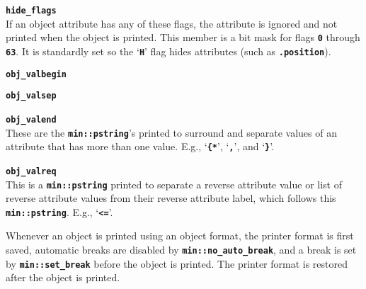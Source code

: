 \documentclass[12pt]{article}
\makeatletter
\newcommand{\TT}[1]{{\tt \bfseries #1}}
\newcommand{\ttmkey}[2]{\TT{#1}\index{#1@{\tt #1}!#2}}
\newcommand{\EOL}{\penalty \exhyphenpenalty}
\newenvironment{itemlist}[1][1.2in]%
	{\begin{list}{}{\setlength{\labelwidth}{#1}%
		        \setlength{\leftmargin}{\labelwidth}%
		        \addtolength{\leftmargin}{+0.2in}%
		        \renewcommand{\makelabel}[1]{##1\hfill}}}%
	{\end{list}}
\makeatother
\begin{document}
\begin{itemlist}[0.2in]
\item[\ttmkey{hide\_flags}{in {\tt min::obj\_format}}]~\\
If an object attribute has any of these flags, the attribute is ignored
and not printed when the object is printed.  This member is a bit
mask for flags \TT{0} through \TT{63}.  It is standardly set so the
`\TT{H}' flag hides attributes (such as \TT{.position}).

\item[\ttmkey{obj\_valbegin}{in {\tt min::obj\_format}}]
\item[\ttmkey{obj\_valsep}{in {\tt min::obj\_format}}]\vspace{-2ex}
\item[\ttmkey{obj\_valend}{in {\tt min::obj\_format}}]\vspace{-2ex}~\\
These are the \TT{min::pstring}'s printed to surround and
separate values of an attribute that has more than one
value.  E.g., `\TT{\{*}', `\TT{,}', and `\TT{*\}}'.

\item[\ttmkey{obj\_valreq}{in {\tt min::obj\_format}}]~\\
This is a \TT{min::pstring} printed to separate a reverse
attribute value or list of reverse attribute values from
their reverse attribute label, which follows this \TT{min::pstring}.
E.g., `\TT{<=}'.

\end{itemlist}

Whenever an object is printed using an object format, the printer
format is first saved, automatic
breaks are disabled by \TT{min::\EOL no\_\EOL auto\_\EOL break},
and a break is set by \TT{min::set\_\EOL break} before
the object is printed.  The printer format is restored after the
object is printed.
\end{document}

